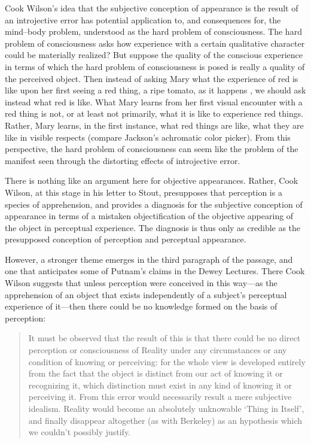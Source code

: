\documentclass[12pt]{article}
\begin{document}
Cook Wilson's idea that the subjective conception of appearance is the result of an introjective error has potential application to, and consequences for, the mind--body problem, understood as the hard problem of consciousness. The hard problem of consciousness asks how experience with a certain qualitative character could be materially realized? But suppose the quality of the conscious experience in terms of which the hard problem of consciousness is posed is really a quality of the perceived object. Then instead of asking Mary what the experience of red is like upon her first seeing a red thing, a ripe tomato, as it happens \citep{Jackson:1982my}, we should ask instead what red is like. What Mary learns from her first visual encounter with a red thing is not, or at least not primarily, what it is like to experience red things. Rather, Mary learns, in the first instance, what red things are like, what they are like in visible respects (compare Jackson's \citeyear{Jackson:1977fk} achromatic color picker). From this perspective, the hard problem of consciousness can seem like the problem of the manifest seen through the distorting effects of introjective error. 


There is nothing like an argument here for objective appearances. Rather, Cook Wilson, at this stage in his letter to Stout, presupposes that perception is a species of apprehension, and provides a diagnosis for the subjective conception of appearance in terms of a mistaken objectification of the objective appearing of the object in perceptual experience. The diagnosis is thus only as credible as the presupposed conception of perception and perceptual appearance.

However, a stronger theme emerges in the third paragraph of the passage, and one that anticipates some of Putnam's \citeyearpar{Putnam:1994kx} claims in the Dewey Lectures. There Cook Wilson suggests that unless perception were conceived in this way---as the apprehension of an object that exists independently of a subject's perceptual experience of it---then there could be no knowledge formed on the basis of perception:
\begin{quote}
    It must be observed that the result of this is that there could be no direct perception or consciousness of Reality under any circumstances or any condition of knowing or perceiving: for the whole view is developed entirely from the fact that the object is distinct from our act of knowing it or recognizing it, which distinction must exist in any kind of knowing it or perceiving it. From this error would necessarily result a mere subjective idealism. Reality would become an absolutely unknowable `Thing in Itself', and finally disappear altogether (as with Berkeley) as an hypothesis which we couldn't possibly justify. \citep[\emph{Correspondence with Stout 1904},][797]{Cook-Wilson:1926sf}
\end{quote}
\end{document}
